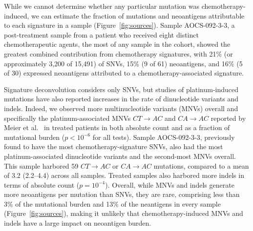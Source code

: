 While we cannot determine whether any particular mutation was chemotherapy-induced, we can estimate the fraction of mutations and neoantigens attributable to each signature in a sample (Figure~\ref{fig:sources}). Sample AOCS-092-3-3, a post-treatment sample from a patient who received eight distinct chemotherapeutic agents, the most of any sample in the cohort, showed the greatest combined contribution from chemotherapy signatures, with 21\% (or approximately 3,200 of 15,491) of SNVs, 15\% (9 of 61) neoantigens, and 16\% (5 of 30) expressed neoantigens attributed to a chemotherapy-associated signature.

Signature deconvolution considers only SNVs, but studies of platinum-induced mutations have also reported increases in the rate of dinucleotide variants and indels. Indeed, we observed more multinucleotide variants (MNVs) overall and specifically the platinum-associated MNVs $CT \rightarrow AC$ and $CA \rightarrow AC$ reported by Meier et al.~\cite{Meier_2014} in treated patients in both absolute count and as a fraction of mutational burden ($p < 10^{-6}$ for all tests). Sample AOCS-092-3-3, previously found to have the most chemotherapy-signature SNVs, also had the most platinum-associated dinucleotide variants and the second-most MNVs overall. This sample harbored 59 $CT \rightarrow AC$ or $CA \rightarrow AC$ mutations, compared to a mean of 3.2 (2.2--4.4) across all samples. Treated samples also harbored more indels in terms of absolute count ($p=10^{-4}$). Overall, while MNVs and indels generate more neoantigens per mutation than SNVs, they are rare, comprising less than 3\% of the mutational burden and 13\% of the neantigens in every sample (Figure~\ref{fig:sources}), making it unlikely that chemotherapy-induced MNVs and indels have a large impact on neoantigen burden.






